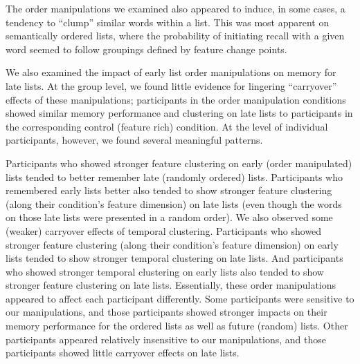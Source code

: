 \documentclass[11pt]{article}
\begin{document}
The order manipulations we examined also appeared to induce, in some cases, a
tendency to ``clump'' similar words within a list. This was most apparent on
semantically ordered lists, where the probability of initiating recall with a
given word seemed to follow groupings defined by feature change points.

We also examined the impact of early list order manipulations on memory for
late lists. At the group level, we found little evidence for lingering
``carryover'' effects of these manipulations; participants in the order
manipulation conditions showed similar memory performance and clustering on
late lists to participants in the corresponding control (feature rich)
condition. At the level of individual participants, however, we found several
meaningful patterns.

Participants who showed stronger feature clustering on early (order
manipulated) lists tended to better remember late (randomly ordered) lists.
Participants who remembered early lists better also tended to show stronger
feature clustering (along their condition's feature dimension) on late lists
(even though the words on those late lists were presented in a random order).
We also observed some (weaker) carryover effects of temporal clustering.
Participants who showed stronger feature clustering (along their condition's
feature dimension) on early lists tended to show stronger temporal clustering
on late lists. And participants who showed stronger temporal clustering on
early lists also tended to show stronger feature clustering on late lists.
Essentially, these order manipulations appeared to affect each participant
differently. Some participants were sensitive to our manipulations, and those
participants showed stronger impacts on their memory performance for the ordered
lists as well as future (random) lists. Other participants appeared relatively
insensitive to our manipulations, and those participants showed little
carryover effects on late lists.
\end{document}
